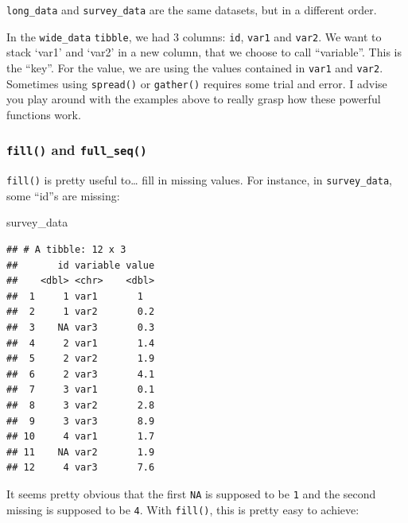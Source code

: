 \documentclass[]{gitbook}
\newenvironment{Shaded}{\begin{snugshade}}{\end{snugshade}}
\newcommand{\DataTypeTok}[1]{\textcolor[rgb]{0.13,0.29,0.53}{#1}}
\newcommand{\KeywordTok}[1]{\textcolor[rgb]{0.13,0.29,0.53}{\textbf{#1}}}
\newcommand{\NormalTok}[1]{#1}
\newcommand{\OperatorTok}[1]{\textcolor[rgb]{0.81,0.36,0.00}{\textbf{#1}}}
\newcommand{\StringTok}[1]{\textcolor[rgb]{0.31,0.60,0.02}{#1}}
\theoremstyle{definition}
\theoremstyle{definition}
\theoremstyle{definition}
\theoremstyle{remark}
\begin{document}
\texttt{long\_data} and \texttt{survey\_data} are the same datasets, but
in a different order.

In the \texttt{wide\_data} \texttt{tibble}, we had 3 columns:
\texttt{id}, \texttt{var1} and \texttt{var2}. We want to stack `var1'
and `var2' in a new column, that we choose to call ``variable''. This is
the ``key''. For the value, we are using the values contained in
\texttt{var1} and \texttt{var2}. Sometimes using \texttt{spread()} or
\texttt{gather()} requires some trial and error. I advise you play
around with the examples above to really grasp how these powerful
functions work.

\hypertarget{fill-and-full_seq}{%
\subsubsection{\texorpdfstring{\texttt{fill()} and
\texttt{full\_seq()}}{fill() and full\_seq()}}\label{fill-and-full_seq}}

\texttt{fill()} is pretty useful to\ldots{} fill in missing values. For
instance, in \texttt{survey\_data}, some ``id''s are missing:

\begin{Shaded}
\begin{Highlighting}[]
\NormalTok{survey_data}
\end{Highlighting}
\end{Shaded}

\begin{verbatim}
## # A tibble: 12 x 3
##       id variable value
##    <dbl> <chr>    <dbl>
##  1     1 var1       1  
##  2     1 var2       0.2
##  3    NA var3       0.3
##  4     2 var1       1.4
##  5     2 var2       1.9
##  6     2 var3       4.1
##  7     3 var1       0.1
##  8     3 var2       2.8
##  9     3 var3       8.9
## 10     4 var1       1.7
## 11    NA var2       1.9
## 12     4 var3       7.6
\end{verbatim}

It seems pretty obvious that the first \texttt{NA} is supposed to be
\texttt{1} and the second missing is supposed to be \texttt{4}. With
\texttt{fill()}, this is pretty easy to achieve:

\begin{Shaded}
\end{Shaded}
\end{document}
